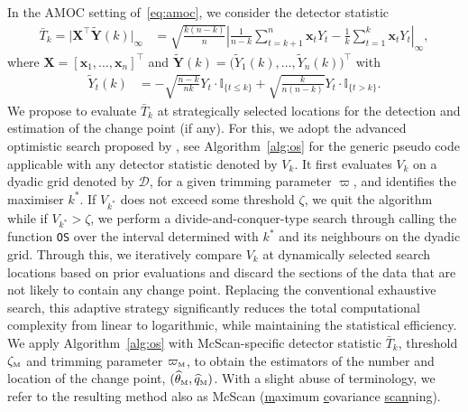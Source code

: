 \documentclass[11pt, a4paper]{article}
\newcommand{\mbf}{\mathbf}
\newcommand{\mc}{\mathcal}
\renewcommand{\l}{\left}
\renewcommand{\r}{\right}
\def\wh{\widehat}
\def\wt{\widetilde}
\newcommand{\cp}{\theta}
\newcommand{\Mc}{\text{\tiny \upshape M}} %
\theoremstyle{definition}
\theoremstyle{definition}
\theoremstyle{definition}
\theoremstyle{definition}
\theoremstyle{definition}
\theoremstyle{remark}
\theoremstyle{definition}
\theoremstyle{definition}
\theoremstyle{definition}
\begin{document}
In the AMOC setting of~\eqref{eq:amoc}, we consider the detector statistic 
\begin{align}
\bar{T}_k = \vert \mbf X^\top \wt{\mbf Y}(k) \vert_\infty &= \sqrt{\frac{k (n - k)}{n}} \l\vert \frac{1}{n - k} \sum_{t = k + 1}^n \mbf x_tY_t - \frac{1}{k} \sum_{t = 1}^k \mbf x_tY_t \r\vert_\infty, 
\label{eq:mcscan}
\end{align}
where $\mbf X = [\mbf x_1, \ldots, \mbf x_n]^\top$ and $\wt{\mbf Y}(k) = \bigl(\wt{Y}_1(k), \ldots, \wt{Y}_n(k)\bigr)^\top$ with
\begin{align}
\wt{Y}_t(k) &= - \sqrt{\frac{n - k}{nk}} Y_t \cdot \mathbb{I}_{\{t \le k\}} + \sqrt{\frac{k}{n (n - k)}} Y_t \cdot \mathbb{I}_{\{t > k\}}.
\label{eq:tilde}
\end{align}
We propose to evaluate $\bar{T}_k$ at strategically selected locations for the detection and estimation of the change point (if any). 
For this, we adopt the advanced optimistic search proposed by \cite{kovacs2024optimistic}, see Algorithm~\ref{alg:os} for the generic pseudo code applicable with any detector statistic denoted by $V_k$.
It first evaluates $V_k$ on a dyadic grid denoted by $\mc D$, for a given trimming parameter $\varpi$, and identifies the maximiser $k^*$.
If $V_{k^*}$ does not exceed some threshold $\zeta$, we quit the algorithm while if $V_{k^*} > \zeta$, we perform a divide-and-conquer-type search through calling the function \texttt{OS} over the interval determined with $k^*$ and its neighbours on the dyadic grid.
Through this, we iteratively compare $V_k$ at dynamically selected search locations based on prior evaluations and discard the sections of the data that are not likely to contain any change point.
Replacing the conventional exhaustive search, this adaptive strategy significantly reduces the total computational complexity from linear to logarithmic, while maintaining the statistical efficiency.
We apply Algorithm~\ref{alg:os} with McScan-specific detector statistic $\bar{T}_k$, threshold $\zeta_{\Mc}$ and trimming parameter $\varpi_{\Mc}$, to obtain the estimators of the number and location of the change point, $(\wh\cp_{\Mc}, \wh q_{\Mc})$.  With a slight abuse of terminology, we refer to the resulting method also as McScan (\underline{m}aximum \underline{c}ovariance \underline{scan}ning).
\end{document}
